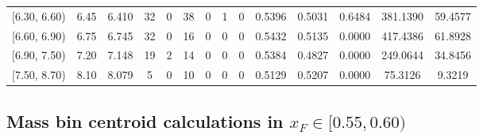 \begin{table}[htbp]
{\begin{tabular}{cc|c|cccccc|ccc|cc}
        {[6.30, 6.60)} & 6.45 & 6.410 & 32 & 0 & 38 & 0 & 1 & 0 & 0.5396 & 0.5031 & 0.6484 & 381.1390 & 59.4577 \\
        {[6.60, 6.90)} & 6.75 & 6.745 & 32 & 0 & 16 & 0 & 0 & 0 & 0.5432 & 0.5135 & 0.0000 & 417.4386 & 61.8928 \\
        {[6.90, 7.50)} & 7.20 & 7.148 & 19 & 2 & 14 & 0 & 0 & 0 & 0.5384 & 0.4827 & 0.0000 & 249.0644 & 34.8456 \\
        {[7.50, 8.70)} & 8.10 & 8.079 & 5 & 0 & 10 & 0 & 0 & 0 & 0.5129 & 0.5207 & 0.0000 & 75.3126 & 9.3219 \\
        \hline\hline
    \end{tabular}
    }
\end{table}

\clearpage
\subsection{\texorpdfstring{Mass bin centroid calculations in $x_F \in [0.55, 0.60)$}{Mass bin centroid calculations in x\_F in [0.55, 0.60)]}}

